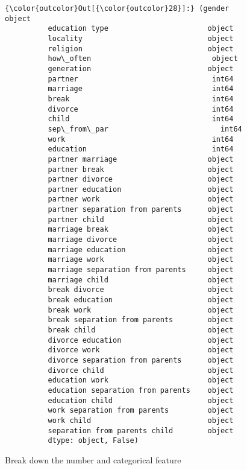 \documentclass[11pt]{article}
\begin{document}
\begin{Verbatim}[commandchars=\\\{\}]
{\color{outcolor}Out[{\color{outcolor}28}]:} (gender                               object
          education type                       object
          locality                             object
          religion                             object
          how\_often                            object
          generation                           object
          partner                               int64
          marriage                              int64
          break                                 int64
          divorce                               int64
          child                                 int64
          sep\_from\_par                          int64
          work                                  int64
          education                             int64
          partner marriage                     object
          partner break                        object
          partner divorce                      object
          partner education                    object
          partner work                         object
          partner separation from parents      object
          partner child                        object
          marriage break                       object
          marriage divorce                     object
          marriage education                   object
          marriage work                        object
          marriage separation from parents     object
          marriage child                       object
          break divorce                        object
          break education                      object
          break work                           object
          break separation from parents        object
          break child                          object
          divorce education                    object
          divorce work                         object
          divorce separation from parents      object
          divorce child                        object
          education work                       object
          education separation from parents    object
          education child                      object
          work separation from parents         object
          work child                           object
          separation from parents child        object
          dtype: object, False)
\end{Verbatim}
            
    Break down the number and categorical feature
\end{document}
